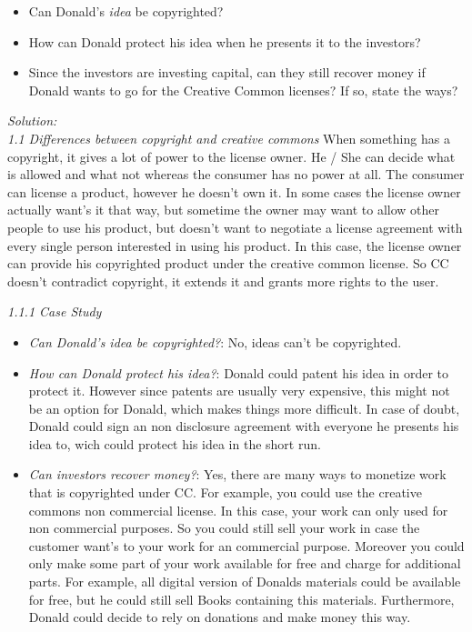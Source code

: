 \documentclass{WeSTassignment}
\begin{document}
\begin{itemize}
\item Can Donald's \emph{idea} be copyrighted?
\item How can Donald protect his idea when he presents it to the investors?
\item Since the investors are investing capital, can they still recover money if Donald wants to go for the Creative Common licenses? If so, state the ways?  
\end{itemize}
\emph{Solution:}\\
\emph{1.1 Differences between copyright and creative commons}
When something has a copyright, it gives a lot of power to the license owner. He / She can decide what is allowed and what not whereas the consumer has no power at all. The consumer can license a product, however he doesn't own it. In some cases the license owner actually want's it that way, but sometime the owner may want to allow other people to use his product, but doesn't want to negotiate a license agreement with every single person interested in using his product. In this case, the license owner can provide his copyrighted product under the creative common license. So CC doesn't contradict copyright, it extends it and grants more rights to the user. 

\emph{1.1.1 Case Study}\\
\begin{itemize}
	\item \emph{Can Donald's idea be copyrighted?}: No, ideas can't be copyrighted.
	\item \emph{How can Donald protect his idea?}: Donald could patent his idea in order to protect it. However since patents are usually very expensive, this might not be an option for Donald, which makes things more difficult. In case of doubt, Donald could sign an non disclosure agreement with everyone he presents his idea to, wich could protect his idea in the short run.
	\item \emph{Can investors recover money?}: Yes, there are many ways to monetize work that is copyrighted under CC. For example, you could use the creative commons non commercial license. In this case, your work can only used for non commercial purposes. So you could still sell your work in case the customer want's to your work for an commercial purpose. Moreover you could only make some part of your work available for free and charge for additional parts. For example, all digital version of Donalds materials could be available for free, but he could still sell Books containing this materials. Furthermore, Donald could decide to rely on donations and make money this way. 
\end{itemize}
\end{document}
